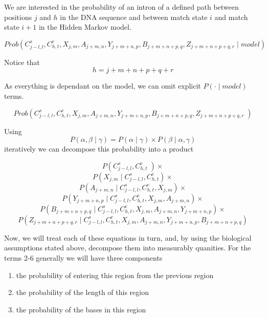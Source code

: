 We are interested in the probability of an intron of a defined path between
positions $j$ and $h$ in the DNA sequence and between match state $i$ and
match state $i+1$ in the Hidden Markov model.


\begin{equation}\label{overall}
Prob(C^s_{j-l,l},C^e_{h,t},X_{j,m},A_{j+m,n},Y_{j+m+n,p},B_{j+m+n+p,q},Z_{j+m+n+p+q,r} \; |\; 
model)
\end{equation}

Notice that $$ h = j+m+n+p+q+r $$

As everything is dependant on the model, we can omit explicit $P( \cdot\; |
\; model)$ terms.


$$
Prob(C^s_{j-l,l},C^e_{h,t},X_{j,m},A_{j+m,n},Y_{j+m+n,p},B_{j+m+n+p,q},Z_{j+m+n+p+q,r} \;)
$$

Using $$ P(\alpha, \beta \; |\;  \gamma) = P(\alpha \; |\;  \gamma) \times P(\beta \; |\; 
\alpha, \gamma) $$ iteratively we can decompose this probability into a
product

\begin{equation}\label{eq1}
P(C^s_{j-l,l},C^e_{h,t}\;) \times
\end{equation}
\begin{equation}\label{eq2}
P(X_{j,m}\; |\; C^s_{j-l,l},C^e_{h,t}) \times
\end{equation}
\begin{equation}\label{eq3}
P(A_{j+m,n}\; |\; C^s_{j-l,l},C^e_{h,t},X_{j,m}) \times
\end{equation}
\begin{equation}\label{eq4}
P(Y_{j+m+n,p}\; |\; C^s_{j-l,l},C^e_{h,t},X_{j,m},A_{j+m,n}) \times
\end{equation}
\begin{equation}\label{eq5}
P(B_{j+m+n+p,q}\; |\; C^s_{j-l,l},C^e_{h,t},X_{j,m},A_{j+m,n},Y_{j+m+n,p}) \times
\end{equation}
\begin{equation}\label{eq6}
P(Z_{j+m+n+p+q,r}\; |\; C^s_{j-l,l},C^e_{h,t},X_{j,m},A_{j+m,n},Y_{j+m+n,p},B_{j+m+n+p,q})
\end{equation}


Now, we will treat each of these equations in turn, and, by using
the biological assumptions stated above, decompose them into measurably
quanities. For the terms 2-6 generally we will have three components
\begin{enumerate}
\item the probability of entering this region from the previous region
\item the probability of the length of this region
\item the probability of the bases in this region
\end{enumerate}

